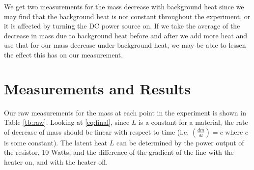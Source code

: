 \documentclass{article}
\begin{document}
We get two measurements for the mass decrease with background heat since we may find that the background heat is not constant throughout the experiment, or it is affected by turning the DC power source on. If we take the average of the decrease in mass due to background heat before and after we add more heat and use that for our mass decrease under background heat, we may be able to lessen the effect this has on our measurement.

\section{Measurements and Results}
\paragraph{}

Our raw measurements for the mass at each point in the experiment is shown in Table \ref{tb:raw}. Looking at \eqref{eq:final}, since $L$ is a constant for a material, the rate of decrease of mass should be linear with respect to time (i.e. $\left( \frac{dm}{dt} \right) = c$ where $c$ is some constant). The latent heat $L$ can be determined by the power output of the resistor, 10 Watts, and the difference of the gradient of the line with the heater on, and with the heater off.
\end{document}
